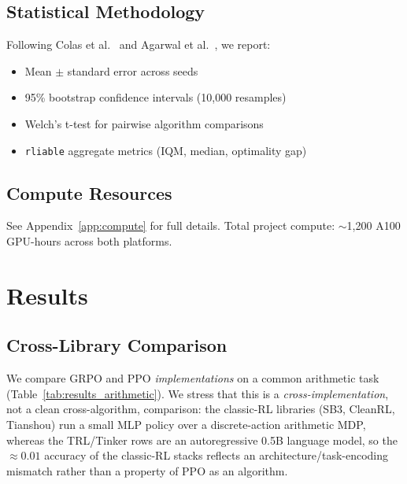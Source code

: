 \documentclass[manuscript,review,anonymous]{acmart}
\begin{document}
\subsection{Statistical Methodology}

Following Colas et al.~\cite{colas2019hitchhiker} and Agarwal et al.~\cite{agarwal2021deep}, we report:
\begin{itemize}
    \item Mean $\pm$ standard error across seeds
    \item 95\% bootstrap confidence intervals (10,000 resamples)
    \item Welch's t-test for pairwise algorithm comparisons
    \item \texttt{rliable} aggregate metrics (IQM, median, optimality gap)
\end{itemize}

\subsection{Compute Resources}

See Appendix~\ref{app:compute} for full details. Total project compute:
$\sim$1,200 A100 GPU-hours across both platforms.

\section{Results}
\label{sec:results}


\subsection{Cross-Library Comparison}

We compare GRPO and PPO \emph{implementations} on a common arithmetic task
(Table~\ref{tab:results_arithmetic}). We stress that this is a
\emph{cross-implementation}, not a clean cross-algorithm, comparison: the
classic-RL libraries (SB3, CleanRL, Tianshou) run a small MLP policy over a
discrete-action arithmetic MDP, whereas the TRL/Tinker rows are an
autoregressive 0.5B language model, so the $\approx 0.01$ accuracy of the
classic-RL stacks reflects an architecture/task-encoding mismatch rather than a
property of PPO as an algorithm.
\end{document}
